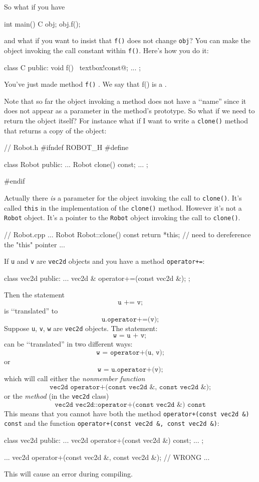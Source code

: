 So what if you have
{\small
\begin{console}
int main()
{
    C obj;
    obj.f();
}
\end{console}
}
and what if you want to insist that
\verb!f()! does not change \verb!obj!?
You can make the object invoking the call constant within \verb!f()!.
Here's how you do it:
{\small
\begin{console}[commandchars=\~\!\@]
class C
{
public:
    void f() ~textbox!const@;
    ...
};
\end{console}
}
You've just made method \verb!f()! .
We say that f() is a .

Note that so far the object invoking a method does not have a
\lq\lq name''
since it does not appear as a parameter in the method's prototype.
So what if we need to return the object itself?
For instance what if I want to write a \verb!clone()! method that returns a
copy of the object:
{\small
\begin{console}
// Robot.h
#ifndef ROBOT_H
#define

class Robot
{
public:
    ...
    Robot clone() const;
    ...
};

#endif
\end{console}
}

Actually there \textit{is} a parameter for the object invoking the
call to \verb!clone()!.
It's called \verb!this! in the implementation of the
\verb!clone()! method.
However it's not a \verb!Robot! object.
It's a pointer to the \verb!Robot! object invoking the call to \verb!clone()!.
{\small
\begin{console}
// Robot.cpp
...
Robot Robot::clone() const
{
    return *this; // need to dereference the "this" pointer
}
...
\end{console}
}

If \verb!u! and \verb!v! are \verb!vec2d! objects and you have a
method \verb!operator+=!:
{\small
\begin{console}
class vec2d
{
public:
    ...
    vec2d & operator+=(const vec2d &);
};
\end{console}
}
Then the statement
\[
	\texttt{u += v;}
\]
is \lq\lq translated'' to 
\[
	\texttt{u.operator+=(v);}
\]
Suppose \verb!u!, \verb!v!, \verb!w! are \verb!vec2d! objects. The statement:
\[
	\texttt{w = u + v} ;
\]
can be \lq\lq translated'' in two different ways:
\[
	\texttt{w = operator+(u, v);}
\]
or
\[
	\texttt{w = u.operator+(v);}
\]
which will call either the \textit{nonmember function}
\[
	\texttt{vec2d operator+(const vec2d \&, const vec2d \&);}
\]
or the \textit{method} (in the \verb!vec2d! class)
\[
	\texttt{vec2d vec2d::operator+(const  vec2d \&) const}
\]
This means that you cannot have both the method
\texttt{operator+(const vec2d \&) const} and the function
\texttt{operator+(const vec2d \&, const vec2d \&)}:
{\small
\begin{console}
class vec2d
{
public:
    ...
    vec2d operator+(const vec2d &) const;
    ...
};

...
vec2d operator+(const vec2d &, const vec2d &); // WRONG
...
\end{console}
}
This will cause an error during compiling.


